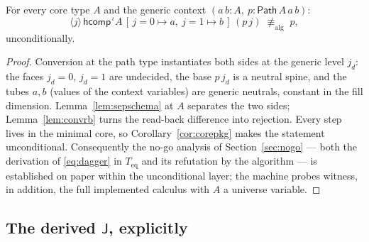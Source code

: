 \documentclass{lmcs}
\newcommand{\hcomp}{\mathsf{hcomp}}
\newcommand{\J}{\mathsf{J}}
\newcommand{\aconv}{\equiv_{\mathrm{alg}}}
\newcommand{\Path}{\mathsf{Path}}
\begin{document}
\begin{prop}
  \label{prop:papersep}
  For every core type $A$ and the generic context
  $(a\,b : A,\ p : \Path\,A\,a\,b)$:
  \[
    \langle j \rangle\, \hcomp^{\,\iota} A\,
      [\,j{=}0 \mapsto a,\ j{=}1 \mapsto b\,]\,(p\,j)
    \;\not\aconv\; p ,
  \]
  unconditionally.
\end{prop}
\begin{proof}
  Conversion at the path type instantiates both sides at the
  generic level $j_d$: the faces $j_d{=}0$, $j_d{=}1$ are
  undecided, the base $p\,j_d$ is a neutral spine, and the tubes
  $a, b$ (values of the context variables) are generic neutrals,
  constant in the fill dimension.  Lemma~\ref{lem:sepschema} at $A$
  separates the two sides; Lemma~\ref{lem:convrb} turns the
  read-back difference into rejection.  Every step lives in the
  minimal core, so Corollary~\ref{cor:corepkg} makes the statement
  unconditional.  Consequently the no-go analysis of
  Section~\ref{sec:nogo} --- both the derivation of
  \eqref{eq:dagger} in $T_{\mathrm{eq}}$ and its refutation by the
  algorithm --- is established on paper within the unconditional
  layer; the machine probes witness, in addition, the full
  implemented calculus with $A$ a universe variable.
\end{proof}

\subsection{The derived $\J$, explicitly}
\label{app:coreJ}
\end{document}
